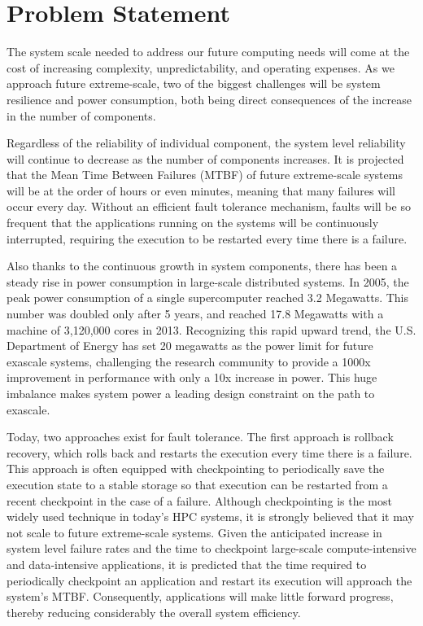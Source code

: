 \section{Problem Statement}

The system scale needed to address our future computing needs will come at the cost of increasing complexity, unpredictability, 
and operating expenses. As we approach future extreme-scale, two of the biggest challenges will be system resilience and power 
consumption, both being direct consequences of the increase in the number of components. 

Regardless of the reliability of individual component, the system level reliability will continue to decrease as the number of 
components increases. It is projected that the Mean Time Between Failures (MTBF) of future extreme-scale systems will be at the order of hours or even minutes, meaning 
that many failures will occur every day. Without an efficient fault tolerance mechanism, faults will be so frequent that the applications running on the 
systems will be continuously interrupted, requiring the execution to be restarted every time there is a failure. 

Also thanks to the continuous growth in system components, there has been a steady rise in power consumption in large-scale distributed systems. 
In 2005, the peak power consumption of a single supercomputer reached 3.2 Megawatts. This number was doubled only after 5 years, and reached 17.8 
Megawatts with a machine of 3,120,000 cores in 2013. Recognizing this rapid upward trend, the U.S. Department of Energy has set 20 
megawatts as the power limit for future exascale systems, 
challenging the research community to provide a 1000x improvement in performance with only a 10x increase in power. 
This huge imbalance makes system power a leading design constraint on the path to exascale. 

Today, two approaches exist for fault tolerance. The first approach is rollback recovery, which rolls back and restarts the execution 
every time there is a failure. This approach is often equipped with checkpointing to periodically save the execution state to a 
stable storage so that execution can be restarted from a recent checkpoint in the case of a failure. 
Although checkpointing is the most widely used technique in today's HPC systems, it is strongly believed that it may not scale to 
future extreme-scale systems. Given the anticipated increase in system level failure rates and the time to checkpoint large-scale 
compute-intensive and data-intensive applications, it is predicted that the time required to periodically checkpoint an application 
and restart its execution will approach the system's MTBF. Consequently, applications will make little forward progress, thereby 
reducing considerably the overall system efficiency. 

